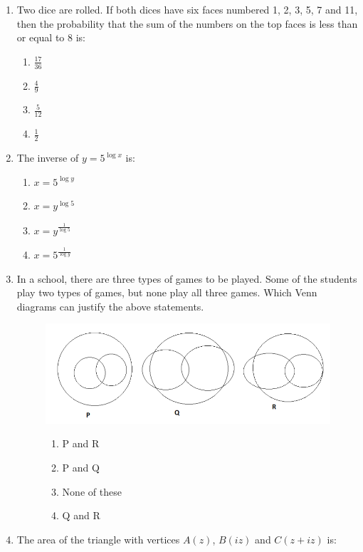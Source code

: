 \documentclass[journal]{IEEEtran}
\begin{document}
\begin{enumerate}
\item Two dice are rolled. If both dices have six faces numbered 1, 2, 3, 5, 7 and 11, then the probability that the sum of the numbers on the top faces is less than or equal to 8 is:
\begin{enumerate}
    \item $\frac{17}{36}$
    \item $\frac{4}{9}$
    \item $\frac{5}{12}$
    \item $\frac{1}{2}$\\
\end{enumerate}
\item The inverse of $y = 5^{\log{x}}$ is:
  \begin{enumerate}
      \item $x = 5^{\log{y}}$
      \item $x = y^{\log{5}}$
      \item $x = y^{\frac{1}{\log{5}}}$
      \item $x = 5^{\frac{1}{\log{y}}}$\\
  \end{enumerate}
\item In a school, there are three types of games to be played. Some of the students play two types of games, but none play all three games. Which Venn diagrams can justify the above statements.
\begin{figure}[h!]
	    \centering
	    \includegraphics[width=0.7\linewidth]{figs/Q3.png}
     \begin{enumerate}
         \item P and R
         \item P and Q
         \item None of these
         \item Q and R\\
     \end{enumerate}
    \end{figure}
 \item The area of the triangle with vertices $A (z)$, $B (iz)$ and $C (z + iz)$ is:
 \begin{enumerate}

\end{enumerate}
\end{enumerate}
\end{document}
